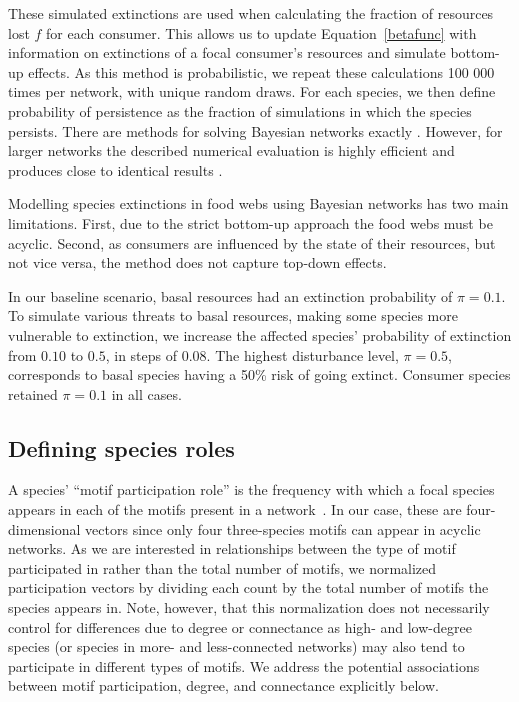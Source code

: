 \documentclass[12pt]{article}
\begin{document}
\begin{spacing}{2.0}
        These simulated extinctions are used when calculating the fraction of resources lost $f$ for each consumer.
        This allows us to update Equation~\ref{betafunc} with information on extinctions of a focal consumer's resources and simulate bottom-up effects. As this method is probabilistic, we repeat these calculations 100 000 times per network, with unique random draws.
	    For each species, we then define probability of persistence as the fraction of simulations in which the species persists. There are methods for solving Bayesian networks exactly \citep{Eklof2013}.
	    However, for larger networks the described numerical evaluation is highly efficient and produces close to identical results \citep{Haussler2020}.
		
		
		Modelling species extinctions in food webs using Bayesian networks has two main limitations. First, due to the strict bottom-up approach the food webs must be acyclic. 
		Second, as consumers are influenced by the state of their resources, but not vice versa, the method does not capture top-down effects.
		
        In our baseline scenario, basal resources had an extinction probability of $\pi = 0.1$. 
		To simulate various threats to basal resources, making some species more vulnerable to extinction, we increase the affected species' probability of extinction from $0.10$ to $0.5$, in steps of $0.08$. 
		The highest disturbance level, $\pi = 0.5$, corresponds to basal species having a 50\% risk of going extinct. 
		Consumer species retained $\pi=0.1$ in all cases.
		
		
	\subsection*{Defining species roles}

        A species' ``motif participation role'' is the frequency with which a focal species appears in each of the motifs present in a network~\citep{Stouffer2012}.
        In our case, these are four-dimensional vectors since only four three-species motifs can appear in acyclic networks.
        As we are interested in relationships between the type of motif participated in rather than the total number of motifs, we normalized participation vectors by dividing each count by the total number of motifs the species appears in.
        Note, however, that this normalization does not necessarily control for differences due to degree or connectance as high- and low-degree species (or species in more- and less-connected networks) may also tend to participate in different types of motifs.
        We address the potential associations between motif participation, degree, and connectance explicitly below. 
        

\end{spacing}
\end{document}
